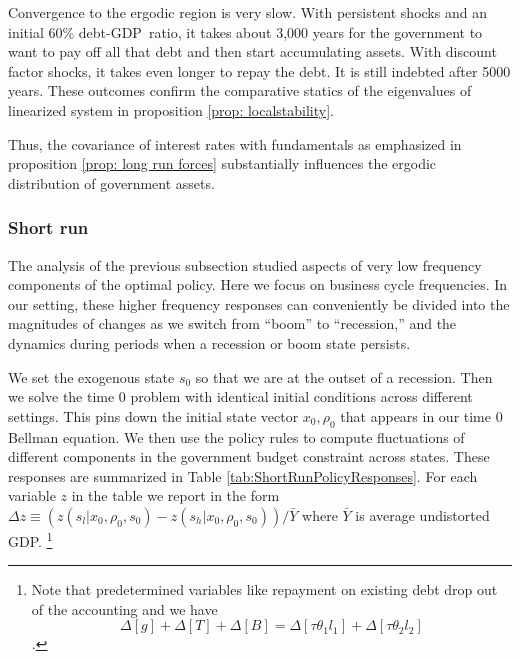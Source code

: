 \documentclass[thmsb,11pt]{article}
\begin{document}
Convergence to the ergodic region is  very slow.  With persistent shocks and an initial 60\% debt-GDP\ ratio,  it takes about 3,000 years for
the government to want to pay off all that debt
and then start accumulating assets. With
discount factor shocks, it takes even longer to repay the debt. It is still indebted after 5000 years. These outcomes confirm the comparative statics of the eigenvalues of linearized system in proposition \ref{prop: localstability}.

Thus, the covariance of interest rates with fundamentals as emphasized in proposition \ref{prop: long run forces} substantially influences the ergodic distribution of government assets.

\subsubsection{Short run}

The analysis of the previous subsection studied  aspects of very low
frequency components of  the optimal policy. Here  we focus on business cycle frequencies.
 In our setting,  these higher frequency responses can conveniently be divided  into the magnitudes of changes as we switch from ``boom''
to ``recession,'' and the dynamics during  periods when a recession or boom state persists.

We set the exogenous state
$s_0$ so  that we are at the outset of a recession.  Then we  solve the time 0 problem with identical initial conditions across
different settings. This pins down the initial state vector  $x_0,\rho_0$  that appears in our time $0$ Bellman equation.
We then use the policy rules to compute fluctuations of
different components in the government budget constraint across states. These responses
are summarized in Table \ref{tab:ShortRunPolicyResponses}. For each variable
$z$ in the table we report in the form $\Delta z\equiv \left( z\left(
s_l|x_0,\rho_0,s_0\right) -z\left( s_h|x_0,\rho_0,s_0\right) \right) /\bar{Y}
$ where $\bar{Y}$ is average undistorted GDP. \footnote{%
Note that predetermined variables like repayment on existing debt drop out
of the accounting and we have
\begin{equation*}
\Delta [g]+\Delta[T]+ \Delta [B]=\Delta[\tau \theta_1 l_1]+ \Delta[\tau
\theta_2 l_2]
\end{equation*}%
.}

\end{document}
